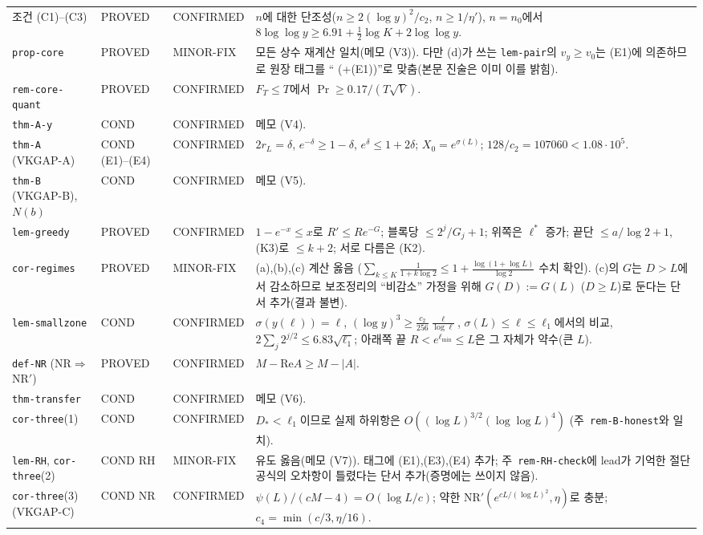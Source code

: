 \begin{center}
\begin{longtable}{p{}p{}p{}p{}}
조건 (C1)--(C3) & PROVED & CONFIRMED & $n$에 대한 단조성($n\ge2(\log y)^2/c_2$, $n\ge1/\eta'$), $n=n_0$에서 $8\log\log y\ge6.91+\frac12\log K+2\log\log y$.\\
\texttt{prop-core} & PROVED & MINOR-FIX & 모든 상수 재계산 일치(메모 (V3)). 다만 (d)가 쓰는 \texttt{lem-pair}의 $v_y\ge v_0$는 (E1)에 의존하므로 원장 태그를 ``\PROVED{} (+(E1))''로 맞춤(본문 진술은 이미 이를 밝힘).\\
\texttt{rem-core-quant} & PROVED & CONFIRMED & $F_T\le T$에서 $\Pr\ge0.17/(T\sqrt V)$.\\
\texttt{thm-A-y} & COND & CONFIRMED & 메모 (V4).\\
\texttt{thm-A} (VKGAP-A) & COND (E1)--(E4) & CONFIRMED & $2r_L=\delta$, $e^{-\delta}\ge1-\delta$, $e^{\delta}\le1+2\delta$; $X_0=e^{\sigma(L)}$; $128/c_2=107060<1.08\cdot10^5$.\\
\texttt{thm-B} (VKGAP-B), $N(b)$ & COND & CONFIRMED & 메모 (V5).\\
\texttt{lem-greedy} & PROVED & CONFIRMED & $1-e^{-x}\le x$로 $R'\le Re^{-G}$; 블록당 $\le2^j/G_j+1$; 위쪽은 $\ell^*$ 증가; 끝단 $\le a/\log2+1$, (K3)로 $\le k+2$; 서로 다름은 (K2).\\
\texttt{cor-regimes} & PROVED & MINOR-FIX & (a),(b),(c) 계산 옳음 ($\sum_{k\le K}\frac1{1+k\log2}\le1+\frac{\log(1+\log L)}{\log2}$ 수치 확인). (c)의 $G$는 $D>L$에서 감소하므로 보조정리의 ``비감소'' 가정을 위해 $G(D):=G(L)$ ($D\ge L$)로 둔다는 단서 추가(결과 불변).\\
\texttt{lem-smallzone} & COND & CONFIRMED & $\sigma(y(\ell))=\ell$, $(\log y)^3\ge\frac{c_2}{256}\frac{\ell}{\log\ell}$, $\sigma(L)\le\ell\le\ell_1$에서의 비교, $2\sum_j2^{j/2}\le6.83\sqrt{\ell_1}$; 아래쪽 끝 $R<e^{\ell_{\min}}\le L$은 그 자체가 약수(큰 $L$).\\
\texttt{def-NR} (NR$\Rightarrow$NR$'$) & PROVED & CONFIRMED & $M-\mathrm{Re}A\ge M-|A|$.\\
\texttt{thm-transfer} & COND & CONFIRMED & 메모 (V6).\\
\texttt{cor-three}(1) & COND & CONFIRMED & $D_*<\ell_1$이므로 실제 하위항은 $O((\log L)^{3/2}(\log\log L)^4)$ (주~\texttt{rem-B-honest}와 일치).\\
\texttt{lem-RH}, \texttt{cor-three}(2) & COND RH & MINOR-FIX & 유도 옳음(메모 (V7)). 태그에 (E1),(E3),(E4) 추가; 주~\texttt{rem-RH-check}에 lead가 기억한 절단 공식의 오차항이 틀렸다는 단서 추가(증명에는 쓰이지 않음).\\
\texttt{cor-three}(3) (VKGAP-C) & COND NR & CONFIRMED & $\psi(L)/(cM-4)=O(\log L/c)$; 약한 $\mathrm{NR}'(e^{cL/(\log L)^2},\eta)$로 충분; $c_4=\min(c/3,\eta/16)$.\\

\end{longtable}
\end{center}

